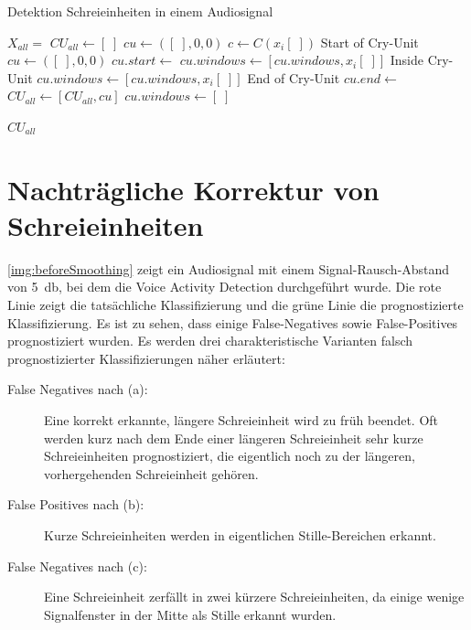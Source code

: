 \begin{algorithm}[h]
	\caption{Detektion Schreieinheiten in einem Audiosignal}
	\label{alg:cryUnit}
	\begin{algorithmic}[1]
		\State $X_{all} = $ 
		\State $ CU_{all} \gets [\;]$
		\State $ cu\gets ([\;],0,0)$
				\State $ c \gets C(x_i[\;])$
				\State \Comment Start of Cry-Unit
						\State $cu\gets ([\;],0,0)$
						\State $cu.start \gets $ 
						\State $cu.windows \gets [cu.windows, x_i[\;]]$
				\EndIf
				\State \Comment Inside Cry-Unit
						\State $cu.windows \gets [cu.windows, x_i[\;]]$
				\EndIf
				\State \Comment End of Cry-Unit
						\State $cu.end \gets $ 
						\State $CU_{all} \gets [CU_{all}, cu]$
						\State $cu.windows \gets [\;]$
				\EndIf
		\EndFor
		
		
		\Return $CU_{all}$
		
		\EndFunction
		
	\end{algorithmic}
\end{algorithm}


\section{Nachträgliche Korrektur von Schreieinheiten}
\label{sec:decision_smoothing_new}

\autoref{img:beforeSmoothing} zeigt ein Audiosignal mit einem Signal-Rausch-Abstand von \SI{5}{\decibel}, bei dem die Voice Activity Detection durchgeführt wurde. Die rote Linie zeigt die tatsächliche Klassifizierung und die grüne Linie die prognostizierte Klassifizierung. Es ist zu sehen, dass einige False-Negatives sowie False-Positives prognostiziert wurden. Es werden drei charakteristische Varianten falsch prognostizierter Klassifizierungen näher erläutert:

\begin{description}
	\item [False Negatives nach (a): ] Eine korrekt erkannte, längere Schreieinheit wird zu früh beendet. Oft werden kurz nach dem Ende einer längeren Schreieinheit sehr kurze Schreieinheiten prognostiziert, die eigentlich noch zu der längeren, vorhergehenden Schreieinheit gehören.
	\item [False Positives nach (b): ] Kurze Schreieinheiten werden in eigentlichen Stille-Bereichen erkannt.
	\item [False Negatives nach (c): ] Eine Schreieinheit zerfällt in zwei kürzere Schreieinheiten, da einige wenige Signalfenster in der Mitte als Stille erkannt wurden.
\end{description}

